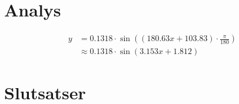 \documentclass[12pt, a4paper]{article}
\begin{document}
\section{Analys}

\begin{equation}
    \begin{split}        
        y&=0.1318\cdot\sin((180.63x+103.83)\cdot\frac{\pi}{180})\\
        &\approx0.1318\cdot\sin(3.153x+1.812)    
    \end{split}
\end{equation}
\section{Slutsatser}
\end{document}
